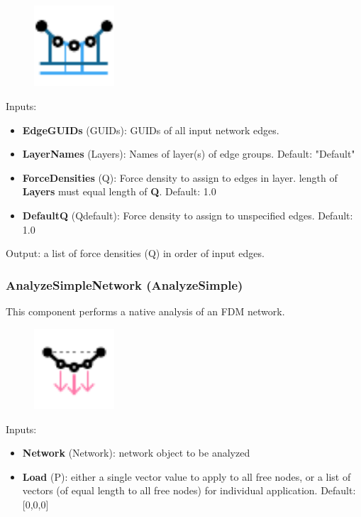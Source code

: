 \begin{figure}[h]
    \centering
    \includegraphics[width = 3cm]{Figures/Qbylayer}
\end{figure}

Inputs:
\begin{itemize}
    \setlength\itemsep{0.05em}
    \item \textbf{EdgeGUIDs} (GUIDs): GUIDs of all input network edges.
    \item \textbf{LayerNames} (Layers): Names of layer(s) of edge groups. {\color{gray} Default: "Default"}
    \item \textbf{ForceDensities} (Q): Force density to assign to edges in layer. {\color{kpink} length of \textbf{Layers} must equal length of \textbf{Q}}. {\color{gray} Default: 1.0}
    \item \textbf{DefaultQ} (Qdefault): Force density to assign to unspecified edges. {\color{gray} Default: 1.0} 
\end{itemize}

Output: a list of force densities (Q) in order of input edges.

\subsubsection{AnalyzeSimpleNetwork (AnalyzeSimple)} \label{AnalyzeSimple}
This component performs a native analysis of an FDM network. 

\begin{figure}[h]
    \centering
    \includegraphics[width = 3cm]{Figures/Analyze}
\end{figure}

Inputs:
\begin{itemize}
    \setlength\itemsep{0.05em}
    \item \textbf{Network} (Network): network object to be analyzed
    \item \textbf{Load} (P): either a single vector value to apply to all free nodes, or a list of vectors (of equal length to all free nodes) for individual application. {\color{gray} Default: [0,0,0]}
\end{itemize}

